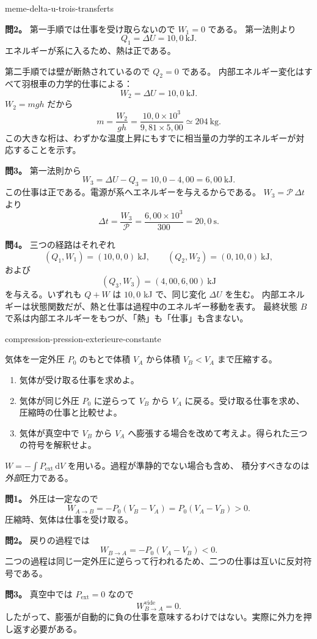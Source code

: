 \begin{exo}{meme-delta-u-trois-transferts}
\begin{solution}
\textbf{問2。} 第一手順では仕事を受け取らないので $W_1=0$ である。
第一法則より
\[
Q_1=\Delta U=10{,}0\ \mathrm{kJ}.
\]
エネルギーが系に入るため、熱は正である。

第二手順では壁が断熱されているので $Q_2=0$ である。
内部エネルギー変化はすべて羽根車の力学的仕事による：
\[
W_2=\Delta U=10{,}0\ \mathrm{kJ}.
\]
$W_2=mgh$ だから
\[
m=\frac{W_2}{gh}
=\frac{10{,}0\times10^3}{9{,}81\times5{,}00}
\simeq 204\ \mathrm{kg}.
\]
この大きな桁は、わずかな温度上昇にもすでに相当量の力学的エネルギーが対応することを示す。

\textbf{問3。} 第一法則から
\[
W_3=\Delta U-Q_3=10{,}0-4{,}00=6{,}00\ \mathrm{kJ}.
\]
この仕事は正である。電源が系へエネルギーを与えるからである。
$W_3=\mathcal P\,\Delta t$ より
\[
\Delta t=\frac{W_3}{\mathcal P}
=\frac{6{,}00\times10^3}{300}
=20{,}0\ \mathrm{s}.
\]

\textbf{問4。} 三つの経路はそれぞれ
\[
(Q_1,W_1)=(10{,}0,0)\ \mathrm{kJ},
\qquad
(Q_2,W_2)=(0,10{,}0)\ \mathrm{kJ},
\]
および
\[
(Q_3,W_3)=(4{,}00,6{,}00)\ \mathrm{kJ}
\]
を与える。いずれも $Q+W$ は $10{,}0$ kJ で、同じ変化 $\Delta U$ を生む。
内部エネルギーは状態関数だが、熱と仕事は過程中のエネルギー移動を表す。
最終状態 $B$ で系は内部エネルギーをもつが、「熱」も「仕事」も含まない。
\end{solution}
\end{exo}

\begin{exo}[一定外圧下の圧縮]{compression-pression-exterieure-constante}

気体を一定外圧 $P_0$ のもとで体積 $V_A$ から体積 $V_B<V_A$ まで圧縮する。

\begin{enumerate}
\item 気体が受け取る仕事を求めよ。
\item 気体が同じ外圧 $P_0$ に逆らって $V_B$ から $V_A$ に戻る。受け取る仕事を求め、圧縮時の仕事と比較せよ。
\item 気体が真空中で $V_B$ から $V_A$ へ膨張する場合を改めて考えよ。得られた三つの符号を解釈せよ。
\end{enumerate}

\begin{indication}
$W=-\int P_{\mathrm{ext}}\,\mathrm{d}V$ を用いる。過程が準静的でない場合も含め、
積分すべきなのは\emph{外部}圧力である。
\end{indication}

\begin{solution}
\textbf{問1。} 外圧は一定なので
\[
W_{A\to B}=-P_0(V_B-V_A)=P_0(V_A-V_B)>0.
\]
圧縮時、気体は仕事を受け取る。

\textbf{問2。} 戻りの過程では
\[
W_{B\to A}=-P_0(V_A-V_B)<0.
\]
二つの過程は同じ一定外圧に逆らって行われるため、二つの仕事は互いに反対符号である。

\textbf{問3。} 真空中では $P_{\mathrm{ext}}=0$ なので
\[
W_{B\to A}^{\mathrm{vide}}=0.
\]
したがって、膨張が自動的に負の仕事を意味するわけではない。実際に外力を押し返す必要がある。
\end{solution}
\end{exo}
